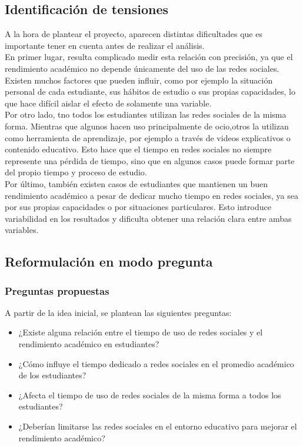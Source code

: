 \documentclass[12pt]{article}
\begin{document}
\subsection{Identificación de tensiones}
A la hora de plantear el proyecto, aparecen distintas dificultades que es importante tener en cuenta antes de realizar el análisis.
\\
En primer lugar, resulta complicado medir esta relación con precisión, ya que el rendimiento académico no depende únicamente del uso de las redes sociales. Existen muchos factores que pueden influir, como por ejemplo la situación personal de cada estudiante, sus hábitos de estudio o sus propias capacidades, lo que hace difícil aislar el efecto de solamente una variable.
\\
Por otro lado, tno todos los estudiantes utilizan las redes sociales de la misma forma. Mientras que algunos hacen uso principalmente de ocio,otros la utilizan como herramienta de aprendizaje, por ejemplo a través de videos explicativos o contenido educativo. Esto hace que el tiempo en redes sociales no siempre represente una pérdida de tiempo, sino que en algunos casos puede formar parte del propio tiempo y proceso de estudio.
\\
Por último, también existen casos de estudiantes que mantienen un buen rendimiento académico a pesar de dedicar mucho tiempo en redes sociales, ya sea por sus propias capacidades o por situaciones particulares. Esto introduce variabilidad en los resultados y dificulta obtener una relación clara entre ambas variables.

\subsection{Reformulación en modo pregunta}
\subsubsection{Preguntas propuestas}
A partir de la idea inicial, se plantean las siguientes preguntas:
\begin{itemize}
    \item ¿Existe alguna relación entre el tiempo de uso de redes sociales y el rendimiento                   académico en estudiantes?
    \item ¿Cómo influye el tiempo dedicado a redes sociales en el promedio académico de los                   estudiantes?
    \item ¿Afecta el tiempo de uso de redes sociales de la misma forma a todos los estudiantes?
    \item ¿Deberían limitarse las redes sociales en el entorno educativo para mejorar el                      rendimiento académico?
\end{itemize}
\end{document}
